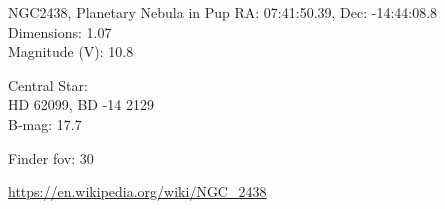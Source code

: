 \begin{block}{NGC2438, Planetary Nebula in Pup}
    RA: 07:41:50.39, Dec: -14:44:08.8 \\ 
    Dimensions: 1.07 \\ 
    Magnitude (V): 10.8


    Central Star: \\ 
      \hspace{1em}HD 62099, BD -14 2129 \\ 
      \hspace{1em}B-mag: 17.7 


    Finder fov: 30 

    \url{https://en.wikipedia.org/wiki/NGC_2438} 
\end{block}